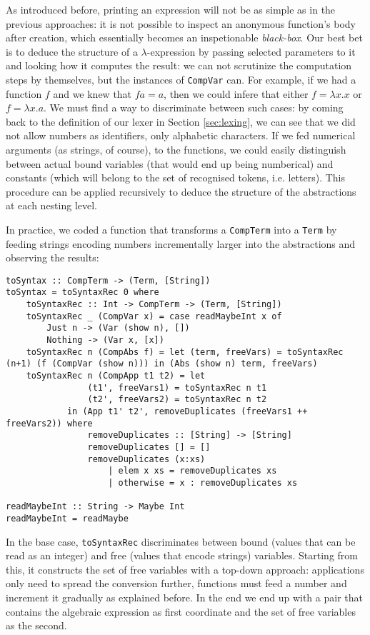 \documentclass{article}
\begin{document}
As introduced before, printing an expression will not be as simple as in the previous approaches: it is not possible to inspect an anonymous function's body after creation, which essentially becomes an inspetionable \textit{black-box}. Our best bet is to deduce the structure of a $\lambda$-expression by passing selected parameters to it and looking how it computes the result: we can not scrutinize the computation steps by themselves, but the instances of \lstinline|CompVar| can. For example, if we had a function $f$ and we knew that $f a = a$, then we could infere that either $f = \lambda x . x$ or $f = \lambda x . a$. We must find a way to discriminate between such cases: by coming back to the definition of our lexer in Section \ref{sec:lexing}, we can see that we did not allow numbers as identifiers, only alphabetic characters. If we fed numerical arguments (as strings, of course), to the functions, we could easily distinguish between actual bound variables (that would end up being numberical) and constants (which will belong to the set of recognised tokens, i.e. letters). This procedure can be applied recursively to deduce the structure of the abstractions at each nesting level.

In practice, we coded a function that transforms a \lstinline|CompTerm| into a \lstinline|Term| by feeding strings encoding numbers incrementally larger into the abstractions and observing the results:

\begin{lstlisting}
toSyntax :: CompTerm -> (Term, [String])
toSyntax = toSyntaxRec 0 where
    toSyntaxRec :: Int -> CompTerm -> (Term, [String])
    toSyntaxRec _ (CompVar x) = case readMaybeInt x of
        Just n -> (Var (show n), [])
        Nothing -> (Var x, [x])
    toSyntaxRec n (CompAbs f) = let (term, freeVars) = toSyntaxRec (n+1) (f (CompVar (show n))) in (Abs (show n) term, freeVars)
    toSyntaxRec n (CompApp t1 t2) = let
                (t1', freeVars1) = toSyntaxRec n t1
                (t2', freeVars2) = toSyntaxRec n t2
            in (App t1' t2', removeDuplicates (freeVars1 ++ freeVars2)) where
                removeDuplicates :: [String] -> [String]
                removeDuplicates [] = []
                removeDuplicates (x:xs)
                    | elem x xs = removeDuplicates xs
                    | otherwise = x : removeDuplicates xs

readMaybeInt :: String -> Maybe Int
readMaybeInt = readMaybe
\end{lstlisting}

In the base case, \lstinline|toSyntaxRec| discriminates between bound (values that can be read as an integer) and free (values that encode strings) variables. Starting from this, it constructs the set of free variables with a top-down approach: applications only need to spread the conversion further, functions must feed a number and increment it gradually as explained before. In the end we end up with a pair that contains the algebraic expression as first coordinate and the set of free variables as the second.
\end{document}
